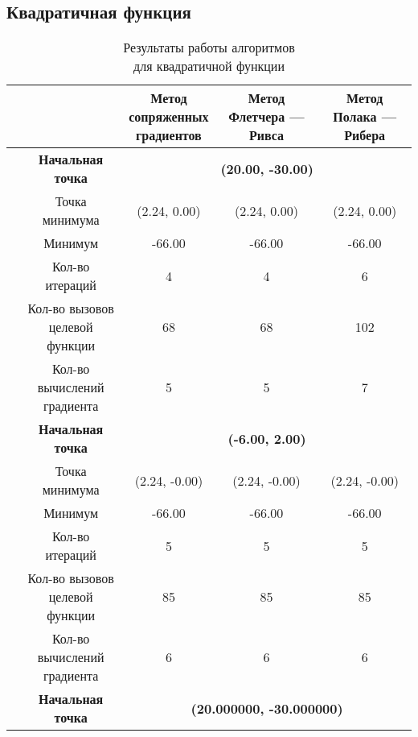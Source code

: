\subsection{Квадратичная функция}

\begin{table}[H]
        \centering
        \vspace*{-1.5em}
        \caption{Результаты работы алгоритмов\\для квадратичной функции}
        \footnotesize
        \begin{tabular}{|c|c|c|c|c|}
        \hline
        & &\makecell{Метод\\сопряженных\\градиентов} &\makecell{Метод\\Флетчера --- Ривса} &\makecell{Метод\\Полака --- Рибера} \\
        \hline
	\multirow{10}{*}{\rotatebox[origin=c]{90}{$\varepsilon = 0.01$}}&\textbf{Начальная точка} &\multicolumn{3}{c|}{\textbf{(20.00, -30.00)}}\\
	\cline{2-5}
	&Точка минимума &(2.24, 0.00) &(2.24, 0.00) &(2.24, 0.00) \\ 
	\cline{2-5}
	&Минимум &-66.00 &-66.00 &-66.00 \\ 
	\cline{2-5}
	&Кол-во итераций &4 &4 &6 \\ 
	\cline{2-5}
	&\makecell{Кол-во вызовов\\целевой функции} &68 &68 &102 \\ 
	\cline{2-5}
	&\makecell{Кол-во вычислений\\градиента} &5 &5 &7 \\ 
	\cline{2-5}
\cline{2-5}&\textbf{Начальная точка} &\multicolumn{3}{c|}{\textbf{(-6.00, 2.00)}}\\
	\cline{2-5}
	&Точка минимума &(2.24, -0.00) &(2.24, -0.00) &(2.24, -0.00) \\ 
	\cline{2-5}
	&Минимум &-66.00 &-66.00 &-66.00 \\ 
	\cline{2-5}
	&Кол-во итераций &5 &5 &5 \\ 
	\cline{2-5}
	&\makecell{Кол-во вызовов\\целевой функции} &85 &85 &85 \\ 
	\cline{2-5}
	&\makecell{Кол-во вычислений\\градиента} &6 &6 &6 \\ 
	\cline{2-5}
	\hline
	\multirow{10}{*}{\rotatebox[origin=c]{90}{$\varepsilon = 1e-06$}}&\textbf{Начальная точка} &\multicolumn{3}{c|}{\textbf{(20.000000, -30.000000)}}\\

\end{tabular}
\end{table}
